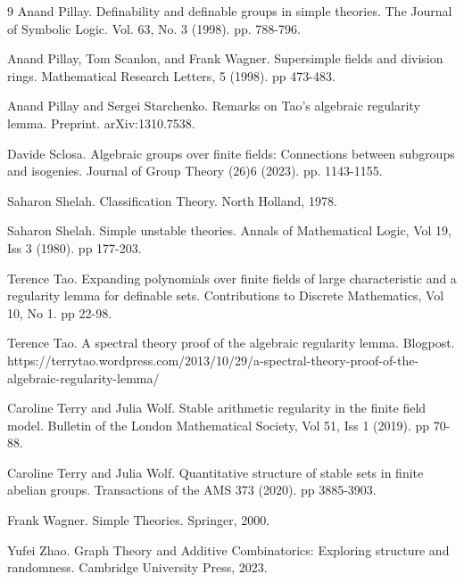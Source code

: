 \documentclass[10pt]{article}
\begin{document}
\begin{thebibliography}{9}
Anand Pillay. Definability and definable groups in simple theories. The Journal of Symbolic Logic. Vol. 63, No. 3 (1998). pp. 788-796.

Anand Pillay, Tom Scanlon, and Frank Wagner. Supersimple fields and division rings. Mathematical Research Letters, 5 (1998). pp 473-483.

Anand Pillay and Sergei Starchenko. Remarks on Tao's algebraic regularity lemma. Preprint. arXiv:1310.7538.

Davide Sclosa. Algebraic groups over finite fields: Connections between subgroups and isogenies. Journal of Group Theory (26)6 (2023). pp. 1143-1155.

Saharon Shelah. Classification Theory. North Holland, 1978.

Saharon Shelah. Simple unstable theories. Annals of Mathematical Logic, Vol 19, Iss 3 (1980). pp 177-203.

Terence Tao. Expanding polynomials over finite fields of large characteristic and a regularity lemma for definable sets. Contributions to Discrete Mathematics, Vol 10, No 1. pp 22-98.

Terence Tao. A spectral theory proof of the algebraic regularity lemma. Blogpost. https://terrytao.wordpress.com/2013/10/29/a-spectral-theory-proof-of-the-algebraic-regularity-lemma/

Caroline Terry and Julia Wolf. Stable arithmetic regularity in the finite field model. Bulletin of the London Mathematical Society, Vol 51, Iss 1 (2019). pp 70-88.

Caroline Terry and Julia Wolf. Quantitative structure of stable sets in finite abelian groups. Transactions of the AMS 373 (2020). pp 3885-3903.

Frank Wagner. Simple Theories. Springer, 2000.

Yufei Zhao. Graph Theory and Additive Combinatorics: Exploring structure and randomness. Cambridge University Press, 2023.






\end{thebibliography}
\end{document}
